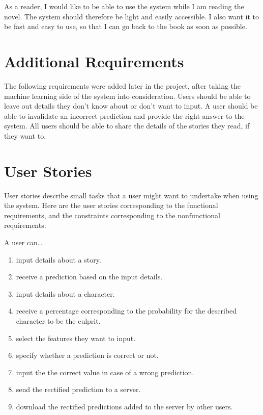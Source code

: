 \documentclass{mproj}
\begin{document}
As a reader, I would like to be able to use the system while I am reading the novel. The system should therefore be light and easily accessible. I also want it to be fast and easy to use, so that I can go back to the book as soon as possible. 

\section{Additional Requirements}
	
The following requirements were added later in the project, after taking the machine learning side of the system into consideration.
Users should be able to leave out details they don't know about or don't want to input.
A user should be able to invalidate an incorrect prediction and provide the right answer to the system. 
All users should be able to share the details of the stories they read, if they want to.

\section{User Stories}
	
User stories describe small tasks that a user might want to undertake when using the system. \cite{userstoriesbook} Here are the user stories corresponding to the functional requirements, and the constraints corresponding to the nonfunctional requirements. \par
	
A user can\ldots
\begin{enumerate}
	\item input details about a story.
	\item receive a prediction based on the input details.
	\item input details about a character.
	\item receive a percentage corresponding to the probability for the described character to be the culprit.
	\item select the features they want to input.
	\item specify whether a prediction is correct or not.
	\item input the the correct value in case of a wrong prediction.
	\item send the rectified prediction to a server.
	\item download the rectified predictions added to the server by other users. \par
\end{enumerate}
\end{document}
